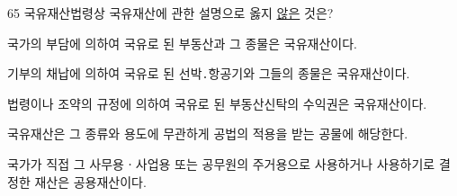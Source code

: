 \begin{question}{65}
국유재산법령상 국유재산에 관한 설명으로 옳지 \uline{않은} 것은?
\begin{choices}
  \item 국가의 부담에 의하여 국유로 된 부동산과 그 종물은 국유재산이다.
  \item 기부의 채납에 의하여 국유로 된 선박․항공기와 그들의 종물은 국유재산이다.
  \item 법령이나 조약의 규정에 의하여 국유로 된 부동산신탁의 수익권은 국유재산이다.
  \item 국유재산은 그 종류와 용도에 무관하게 공법의 적용을 받는 공물에 해당한다.
  \item 국가가 직접 그 사무용ㆍ사업용 또는 공무원의 주거용으로 사용하거나 사용하기로 결정한 재산은 공용재산이다.
\end{choices}
\end{question}
